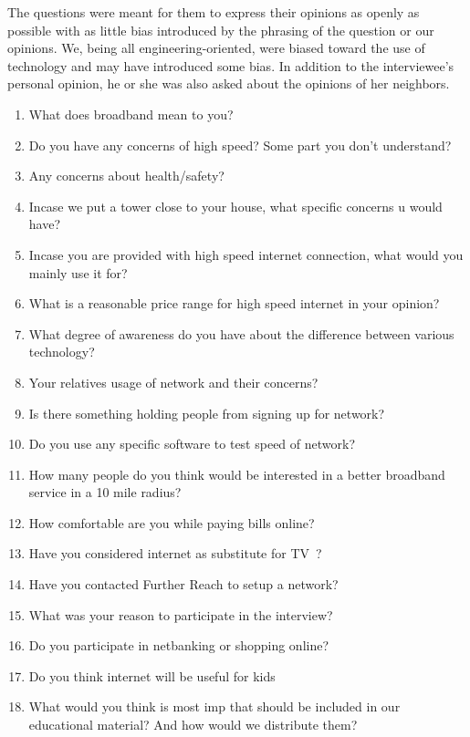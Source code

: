 The questions were meant for
them to express their opinions as openly as possible with as little bias introduced by the
phrasing of the question or our opinions. We, being all engineering-oriented,
were biased toward the use of technology and may have introduced some bias. In addition
to the interviewee's personal opinion, he or she was also asked about the opinions of her
neighbors.

\begin{table}
\begin{enumerate}
    \item What does broadband mean to you?
    \item Do you have any concerns of high speed? Some part you don’t understand?
    \item Any concerns about health/safety?
    \item Incase we put a tower close to your house, what specific concerns u would have?
    \item Incase you are provided with high speed internet connection, what would you mainly use it for?
    \item What is a reasonable price range for high speed internet in your opinion?
    \item What degree of awareness do you have about the difference between various technology?
    \item Your relatives usage of network and their concerns?
    \item Is there something holding people from signing up for network?
    \item Do you use any specific software to test speed of network?
    \item How many people do you think would be interested in a better broadband service in a 10 mile radius?
    \item How comfortable are you while paying bills online?
    \item Have you considered internet as substitute for TV~?
    \item Have you contacted Further Reach to setup a network?
    \item What was your reason to participate in the interview?
    \item Do you participate in netbanking or shopping online?
    \item Do you think internet will be useful for kids
    \item What would you think is most imp that should be included in our educational material? And how would we distribute them?

\end{enumerate}
\end{table}
